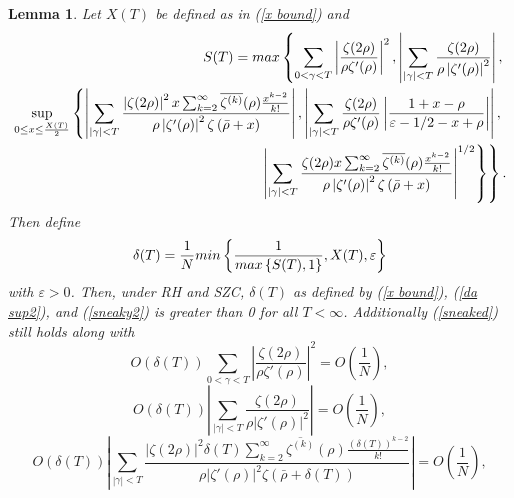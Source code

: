 \documentclass[11pt,article]{amsart}
\numberwithin{equation}{section}
\newtheorem{lemma}{Lemma}
\numberwithin{equation}{section}
\numberwithin{lemma}{section}
\numberwithin{prop}{section}
\begin{document}
\begin{lemma}
Let $X(T)$ be defined as in (\ref{x bound}) and
\begin{align}
S(T)=\textnormal{max}\left\{\sum_{0<\gamma<T}\left|\frac{\zeta(2\rho)}{\rho\zeta'(\rho)}\right|^{2}, \left|\sum_{\left|\gamma\right|<T}\frac{\zeta(2\rho)}{\rho\left|\zeta'(\rho)\right|^{2}}\right|, \right. \nonumber \\ \left. \sup_{0\leq x \leq \frac{X(T)}{2}}\left\{\left|\sum_{\left|\gamma\right|<T}\frac{\left|\zeta(2\rho)\right|^{2}x\sum_{k=2}^{\infty}\overline{\zeta^{(k)}}(\rho)\frac{x^{k-2}}{k!}}{\rho\left|\zeta'(\rho)\right|^{2}\zeta\left(\bar{\rho}+x\right)}\right|, \left|\sum_{\left|\gamma\right|<T}\frac{\zeta(2\rho)}{\rho\zeta'(\rho)}\left|\frac{1+x-\rho}{\varepsilon-1/2-x+\rho}\right|\right|,\right. \right. \nonumber \\ \left. \left. \left|\sum_{\left|\gamma\right|<T}\frac{\zeta(2\rho)x\sum_{k=2}^{\infty}\overline{\zeta^{(k)}}(\rho)\frac{x^{k-2}}{k!}}{\rho\left|\zeta'(\rho)\right|^{2}\zeta\left(\bar{\rho}+x\right)}\right|^{1/2}\right\} \right\}.
\label{da sup2}
\end{align}
Then define 
\begin{equation}
\delta(T)=\frac{1}{N}\textnormal{min}\left\{\frac{1}{\textnormal{max}\left\{S(T),1\right\}},X(T),\varepsilon\right\} \label{sneaky2}
\end{equation}
with $\varepsilon>0$. Then, under RH and SZC, $\delta(T)$ as defined by (\ref{x bound}), (\ref{da sup2}), and (\ref{sneaky2}) is greater than 0 for all $T<\infty$. Additionally (\ref{sneaked}) still holds along with
\begin{equation}
O\left(\delta(T)\right)\sum_{0<\gamma<T}\left|\frac{\zeta(2\rho)}{\rho\zeta'(\rho)}\right|^{2}=O\left(\frac{1}{N}\right), \label{probterm12}
\end{equation}
\begin{equation}
O\left(\delta(T)\right) \left|\sum_{\left|\gamma\right|<T}\frac{\zeta(2\rho)}{\rho\left|\zeta'(\rho)\right|^{2}}\right|=O\left(\frac{1}{N}\right), \label{probterm22}
\end{equation}
\begin{equation}
O\left(\delta(T)\right)\left|\sum_{\left|\gamma\right|<T}\frac{\left|\zeta(2\rho)\right|^{2}\delta(T)\sum_{k=2}^{\infty}\overline{\zeta^{(k)}}(\rho)\frac{\left(\delta(T)\right)^{k-2}}{k!}}{\rho\left|\zeta'(\rho)\right|^{2}\zeta\left(\bar{\rho}+\delta(T)\right)}\right|=O\left(\frac{1}{N}\right), \label{probterm32}
\end{equation}

\end{lemma}
\end{document}
